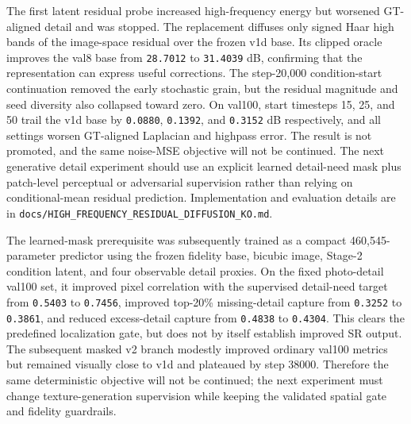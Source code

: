 \documentclass[
  10pt,
]{article}
\begin{document}
The first latent residual probe increased high-frequency energy but
worsened GT-aligned detail and was stopped. The replacement diffuses
only signed Haar high bands of the image-space residual over the frozen
v1d base. Its clipped oracle improves the val8 base from
\texttt{28.7012} to \texttt{31.4039} dB, confirming that the
representation can express useful corrections. The step-20,000
condition-start continuation removed the early stochastic grain, but the
residual magnitude and seed diversity also collapsed toward zero. On
val100, start timesteps 15, 25, and 50 trail the v1d base by
\texttt{0.0880}, \texttt{0.1392}, and \texttt{0.3152} dB respectively,
and all settings worsen GT-aligned Laplacian and highpass error. The
result is not promoted, and the same noise-MSE objective will not be
continued. The next generative detail experiment should use an explicit
learned detail-need mask plus patch-level perceptual or adversarial
supervision rather than relying on conditional-mean residual prediction.
Implementation and evaluation details are in
\texttt{docs/HIGH\_FREQUENCY\_RESIDUAL\_DIFFUSION\_KO.md}.

The learned-mask prerequisite was subsequently trained as a compact
460,545-parameter predictor using the frozen fidelity base, bicubic
image, Stage-2 condition latent, and four observable detail proxies. On
the fixed photo-detail val100 set, it improved pixel correlation with
the supervised detail-need target from \texttt{0.5403} to
\texttt{0.7456}, improved top-20\% missing-detail capture from
\texttt{0.3252} to \texttt{0.3861}, and reduced excess-detail capture
from \texttt{0.4838} to \texttt{0.4304}. This clears the predefined
localization gate, but does not by itself establish improved SR output.
The subsequent masked v2 branch modestly improved ordinary val100
metrics but remained visually close to v1d and plateaued by step 38000.
Therefore the same deterministic objective will not be continued; the
next experiment must change texture-generation supervision while keeping
the validated spatial gate and fidelity guardrails.
\end{document}
